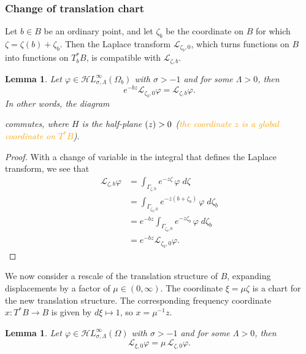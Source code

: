\documentclass{article}
\let\Re\relax
\DeclareMathOperator{\Re}{Re}
\newcommand{\singexp}[2]{\mathcal{H}L^\infty_{#1, #2}}
\newcommand{\maps}{\colon}
\newcommand{\laplace}{\mathcal{L}}
\theoremstyle{definition}
\theoremstyle{plain}
\newtheorem{lemma}[definition]{Lemma}
\begin{document}
\subsubsection{Change of translation chart}\label{sec:change-translation}
Let $b \in B$ be an ordinary point, and let $\zeta_b$ be the coordinate on $B$ for which $\zeta = \zeta(b) + \zeta_b$. Then the Laplace transform $\laplace_{\zeta_b,0}$, which turns functions on $B$ into functions on $T^*_{b}B$, is compatible with $\laplace_{\zeta,b}$.  
\begin{lemma}\label{translation}
Let $\varphi\in\singexp{\sigma}{\Lambda}(\Omega_b)$ with $\sigma>-1$ and for some $\Lambda>0$, then
   \begin{equation}
    \label{change-chart}
    e^{-bz} \laplace_{\zeta_b, 0} \varphi = \laplace_{\zeta, b} \varphi.
\end{equation}
In other words, the diagram 
\begin{center}
\end{center}
commutes, where $H$ is the half-plane $\Re(z) > 0$ (\textcolor{orange}{the coordinate $z$ is a global coordinate on $T^*B$}).
\end{lemma}
\begin{proof}
With a change of variable in the integral that defines the Laplace transform, we see that
\begin{align*}
\laplace_{\zeta, b} \varphi & = \int_{\Gamma_{\zeta,b}} e^{-z \zeta}\,\varphi\;d\zeta \\
& = \int_{\Gamma_{\zeta_b,0}} e^{-z(b + \zeta_b)}\,\varphi\;d\zeta_b \\
& = e^{-b z} \int_{\Gamma_{\zeta_b,0}} e^{-z\zeta_b}\,\varphi\;d\zeta_b \\
& = e^{-b z} \laplace_{\zeta_b, 0} \varphi.
\end{align*}
\end{proof}
We now consider a rescale of the translation structure of $B$, expanding displacements by a factor of $\mu \in (0, \infty)$. The coordinate $\xi = \mu\zeta$ is a chart for the new translation structure. The corresponding frequency coordinate $x \maps T^*B \to B$ is given by $d\xi \mapsto 1$, so $x = \mu^{-1} z$. 
\begin{lemma}
Let $\varphi\in\singexp{\sigma}{\Lambda}(\Omega)$ with $\sigma>-1$ and for some $\Lambda>0$, then
    \[ \laplace_{\xi, 0} \varphi = \mu\,\laplace_{\zeta, 0} \varphi. \]
\end{lemma}
\end{document}
